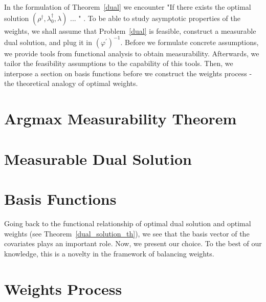 In the formulation of Theorem~\ref{dual} we encounter "If there exists the optimal solution $(\rho^\dagger,\lambda_0^\dagger,\lambda)$ ... " .
To be able to study asymptotic properties of the weights, we 
shall assume that Problem~\ref{dual} is feasible,
construct a measurable dual solution, and plug it in $(\varphi^{'})^{-1}$.
Before we formulate concrete assumptions, we provide tools from functional analysis
to obtain measurability. Afterwards, we tailor the feasibility assumptions to the capability of this tools.
Then, we interpose a section on basis functions before we construct the weights process - the theoretical analogy of optimal weights.
\section{Argmax Measurability Theorem}
  
\section{Measurable Dual Solution}
  
\section{Basis Functions}
Going back to the functional relationship of optimal dual solution and optimal weights (see Theorem~\ref{dual_solution_th}), we see
that the basis vector of the covariates
plays an important role.
%
Now, we present our choice.
%
To the best of our knowledge, this is a novelty in the framework of balancing weights.

  
\section{Weights Process}
  
